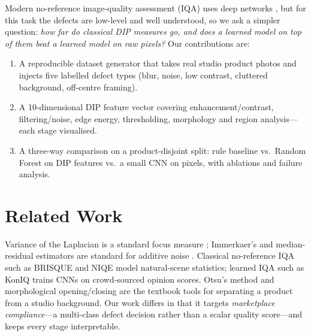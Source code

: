 \documentclass[conference]{IEEEtran}
\begin{document}
Modern no-reference image-quality assessment (IQA) uses deep networks \cite{niqe,brisque,koniq}, but for this task the defects are low-level and well understood, so we ask a simpler question: \emph{how far do classical DIP measures go, and does a learned model on top of them beat a learned model on raw pixels?} Our contributions are:
\begin{enumerate}
\item A reproducible dataset generator that takes real studio product photos and injects five labelled defect types (blur, noise, low contrast, cluttered background, off-centre framing).
\item A 10-dimensional DIP feature vector covering enhancement/contrast, filtering/noise, edge energy, thresholding, morphology and region analysis---each stage visualised.
\item A three-way comparison on a product-disjoint split: rule baseline vs.\ Random Forest on DIP features vs.\ a small CNN on pixels, with ablations and failure analysis.
\end{enumerate}

\section{Related Work}
Variance of the Laplacian is a standard focus measure \cite{pech2000}; Immerkaer's and median-residual estimators are standard for additive noise \cite{immerkaer}. Classical no-reference IQA such as BRISQUE \cite{brisque} and NIQE \cite{niqe} model natural-scene statistics; learned IQA such as KonIQ \cite{koniq} trains CNNs on crowd-sourced opinion scores. Otsu's method \cite{otsu} and morphological opening/closing \cite{gonzalez} are the textbook tools for separating a product from a studio background. Our work differs in that it targets \emph{marketplace compliance}---a multi-class defect decision rather than a scalar quality score---and keeps every stage interpretable.
\end{document}
